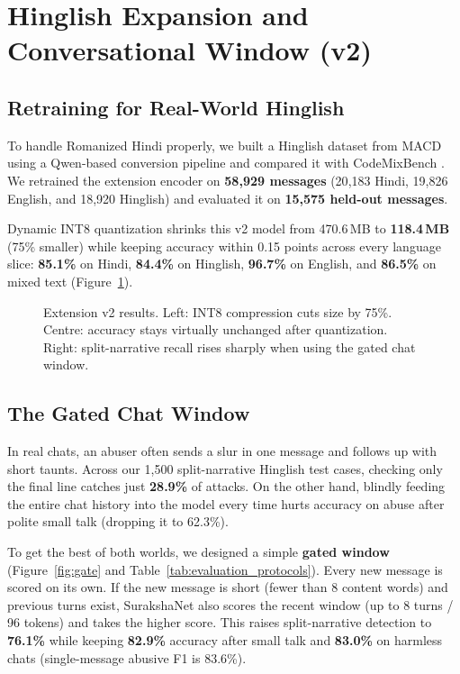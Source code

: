\documentclass[11pt,a4paper]{article}
\begin{document}
\section{Hinglish Expansion and Conversational Window (v2)}

\subsection{Retraining for Real-World Hinglish}
To handle Romanized Hindi properly, we built a Hinglish dataset from MACD using a Qwen-based conversion pipeline and compared it with CodeMixBench \cite{yang-chai-2025-codemixbench}. We retrained the extension encoder on \textbf{58{,}929 messages} (20{,}183 Hindi, 19{,}826 English, and 18{,}920 Hinglish) and evaluated it on \textbf{15{,}575 held-out messages}.

Dynamic INT8 quantization shrinks this v2 model from 470.6\,MB to \textbf{118.4\,MB} (75\% smaller) while keeping accuracy within 0.15 points across every language slice: \textbf{85.1\%} on Hindi, \textbf{84.4\%} on Hinglish, \textbf{96.7\%} on English, and \textbf{86.5\%} on mixed text (Figure~\ref{fig:results1}).

\begin{figure}[H]
  \centering
  \resizebox{0.98\textwidth}{!}{}
  \caption{Extension v2 results. Left: INT8 compression cuts size by 75\%. Centre: accuracy stays virtually unchanged after quantization. Right: split-narrative recall rises sharply when using the gated chat window.}
  \label{fig:results1}
\end{figure}

\subsection{The Gated Chat Window}
In real chats, an abuser often sends a slur in one message and follows up with short taunts. Across our 1{,}500 split-narrative Hinglish test cases, checking only the final line catches just \textbf{28.9\%} of attacks. On the other hand, blindly feeding the entire chat history into the model every time hurts accuracy on abuse after polite small talk (dropping it to 62.3\%).

To get the best of both worlds, we designed a simple \textbf{gated window} (Figure~\ref{fig:gate} and Table~\ref{tab:evaluation_protocols}). Every new message is scored on its own. If the new message is short (fewer than 8 content words) and previous turns exist, SurakshaNet also scores the recent window (up to 8 turns / 96 tokens) and takes the higher score. This raises split-narrative detection to \textbf{76.1\%} while keeping \textbf{82.9\%} accuracy after small talk and \textbf{83.0\%} on harmless chats (single-message abusive F1 is 83.6\%).
\end{document}
